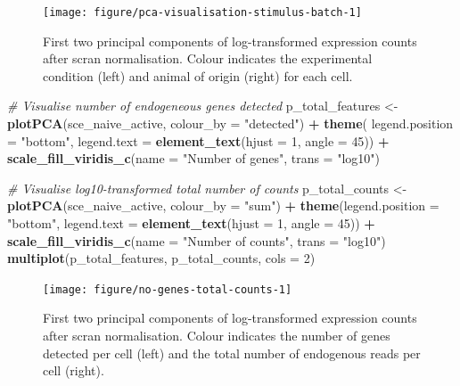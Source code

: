 \documentclass[9pt,a4paper,]{extarticle}
\newenvironment{Shaded}{\begin{snugshade}}{\end{snugshade}}
\newcommand{\CommentTok}[1]{\textcolor[rgb]{0.56,0.35,0.01}{\textit{#1}}}
\newcommand{\DataTypeTok}[1]{\textcolor[rgb]{0.13,0.29,0.53}{#1}}
\newcommand{\DecValTok}[1]{\textcolor[rgb]{0.00,0.00,0.81}{#1}}
\newcommand{\KeywordTok}[1]{\textcolor[rgb]{0.13,0.29,0.53}{\textbf{#1}}}
\newcommand{\NormalTok}[1]{#1}
\newcommand{\OperatorTok}[1]{\textcolor[rgb]{0.81,0.36,0.00}{\textbf{#1}}}
\newcommand{\StringTok}[1]{\textcolor[rgb]{0.31,0.60,0.02}{#1}}
\begin{document}
\begin{figure}

{\centering \texttt{[image: figure/pca-visualisation-stimulus-batch-1]} 

}

\caption{First two principal components of log-transformed expression counts after scran normalisation. Colour indicates the experimental condition (left) and animal of origin (right) for each cell.}\label{fig:pca-visualisation-stimulus-batch}
\end{figure}

\begin{Shaded}
\begin{Highlighting}[]
\CommentTok{# Visualise number of endogeneous genes detected}
\NormalTok{p_total_features <-}\StringTok{ }\KeywordTok{plotPCA}\NormalTok{(sce_naive_active, }\DataTypeTok{colour_by =} \StringTok{"detected"}\NormalTok{) }\OperatorTok{+}
\StringTok{  }\KeywordTok{theme}\NormalTok{(}
    \DataTypeTok{legend.position =} \StringTok{"bottom"}\NormalTok{,}
    \DataTypeTok{legend.text =} \KeywordTok{element_text}\NormalTok{(}\DataTypeTok{hjust =} \DecValTok{1}\NormalTok{, }\DataTypeTok{angle =} \DecValTok{45}\NormalTok{)) }\OperatorTok{+}
\StringTok{  }\KeywordTok{scale_fill_viridis_c}\NormalTok{(}\DataTypeTok{name =} \StringTok{"Number of genes"}\NormalTok{, }\DataTypeTok{trans =} \StringTok{"log10"}\NormalTok{)}

\CommentTok{# Visualise log10-transformed total number of counts}
\NormalTok{p_total_counts <-}\StringTok{ }\KeywordTok{plotPCA}\NormalTok{(sce_naive_active, }\DataTypeTok{colour_by =} \StringTok{"sum"}\NormalTok{) }\OperatorTok{+}
\StringTok{  }\KeywordTok{theme}\NormalTok{(}\DataTypeTok{legend.position =} \StringTok{"bottom"}\NormalTok{,}
    \DataTypeTok{legend.text =} \KeywordTok{element_text}\NormalTok{(}\DataTypeTok{hjust =} \DecValTok{1}\NormalTok{, }\DataTypeTok{angle =} \DecValTok{45}\NormalTok{)) }\OperatorTok{+}
\StringTok{  }\KeywordTok{scale_fill_viridis_c}\NormalTok{(}\DataTypeTok{name =} \StringTok{"Number of counts"}\NormalTok{, }\DataTypeTok{trans =} \StringTok{"log10"}\NormalTok{)}
\KeywordTok{multiplot}\NormalTok{(p_total_features, p_total_counts, }\DataTypeTok{cols =} \DecValTok{2}\NormalTok{)}
\end{Highlighting}
\end{Shaded}

\begin{figure}

{\centering \texttt{[image: figure/no-genes-total-counts-1]} 

}

\caption{First two principal components of log-transformed expression counts after scran normalisation. Colour indicates the number of genes detected per cell (left) and the total number of endogenous reads per cell (right).}\label{fig:no-genes-total-counts}
\end{figure}
\end{document}
